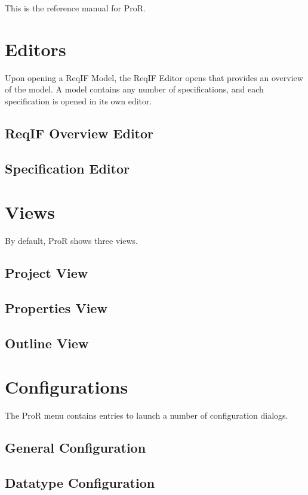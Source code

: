 This is the reference manual for ProR.

\section{Editors}

Upon opening a ReqIF Model, the ReqIF Editor opens that provides an
overview of the model. A model contains any number of specifications,
and each specification is opened in its own editor.

\subsection{ReqIF Overview Editor}

\subsection{Specification Editor}

\section{Views}

By default, ProR shows three views.

\subsection{Project View}

\subsection{Properties View}

\subsection{Outline View}

\section{Configurations}

The ProR menu contains entries to launch a number of configuration
dialogs.

\subsection{General Configuration}

\subsection{Datatype Configuration}

